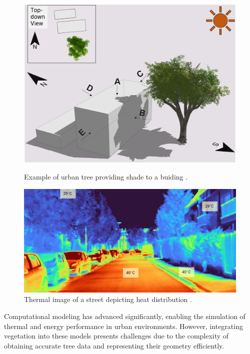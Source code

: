 \documentclass[12pt]{article}
\begin{document}
\begin{figure}[H]
    \centering
    \begin{minipage}{0.45\textwidth}
        \centering
        \includegraphics[width=\textwidth]{images/TreeShade.png}
        \caption{Example of urban tree providing shade to a buiding \cite{img:TreeShade}.}
    \end{minipage}\hfill
    \begin{minipage}{0.45\textwidth}
        \centering
        \includegraphics[width=\textwidth]{images/heat_street.png}
        \caption{Thermal image of a street depicting heat distribution \cite{img:street_thermography}.}
    \end{minipage}
\end{figure}

Computational modeling has advanced significantly, enabling the simulation of thermal 
and energy performance in urban environments. However, integrating vegetation into 
these models presents challenges due to the complexity of obtaining accurate tree data 
and representing their geometry efficiently\cite{AdTree}.
\end{document}
